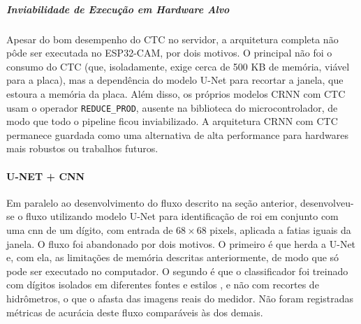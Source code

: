 \subparagraph{Inviabilidade de Execução em Hardware Alvo}
Apesar do bom desempenho do CTC no servidor, a arquitetura completa
não pôde ser executada no ESP32-CAM, por dois motivos. O principal não foi o consumo do CTC
(que, isoladamente, exige cerca de 500 KB de memória, viável para a placa), mas a
dependência do modelo U-Net para recortar a janela, que estoura a memória da placa. Além
disso, os próprios modelos CRNN com CTC usam o operador \texttt{REDUCE\_PROD}, ausente na
biblioteca do microcontrolador, de modo que todo o pipeline ficou inviabilizado. A
arquitetura CRNN com CTC permanece guardada como uma alternativa
de alta performance para hardwares mais robustos ou trabalhos futuros.

\paragraph{U-NET + CNN}
Em paralelo ao desenvolvimento do fluxo descrito na seção anterior, 
desenvolveu-se o fluxo utilizando modelo U-Net para identificação de \gls{roi} em conjunto com
uma \gls{cnn} de um dígito, com entrada de $68 \times 68$ pixels, aplicada a fatias iguais da
janela. O fluxo foi abandonado por dois motivos. O primeiro é que herda a U-Net e, com ela,
as limitações de memória descritas anteriormente, de modo que só pode ser executado no
computador. O segundo é que o classificador foi treinado com dígitos isolados em diferentes
fontes e estilos \cite{iqbal2019digits}, e não com recortes de hidrômetros, o que o afasta
das imagens reais do medidor. Não foram registradas métricas de acurácia deste fluxo
comparáveis às dos demais.
